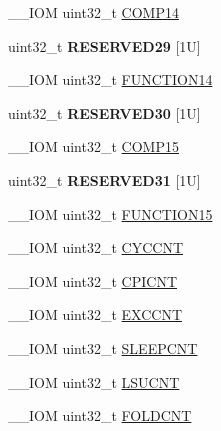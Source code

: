 \begin{DoxyCompactItemize}
\item 
\+\_\+\+\_\+\+I\+OM uint32\+\_\+t \hyperlink{struct_d_w_t___type_a85368a4ec78f4074e5f9cbba92ae1eb9}{C\+O\+M\+P14}
\item 
\mbox{\label{struct_d_w_t___type_af577b10077e677307bb79df1597141ca}} 
uint32\+\_\+t {\bfseries R\+E\+S\+E\+R\+V\+E\+D29} \mbox{[}1\+U\mbox{]}
\item 
\+\_\+\+\_\+\+I\+OM uint32\+\_\+t \hyperlink{struct_d_w_t___type_a85138a411459f923ea8e05312d70af71}{F\+U\+N\+C\+T\+I\+O\+N14}
\item 
\mbox{\label{struct_d_w_t___type_a212676fc2527b4b4f80155cb14171b4e}} 
uint32\+\_\+t {\bfseries R\+E\+S\+E\+R\+V\+E\+D30} \mbox{[}1\+U\mbox{]}
\item 
\+\_\+\+\_\+\+I\+OM uint32\+\_\+t \hyperlink{struct_d_w_t___type_aa46b44e5aacd3ca3937741f423ab480f}{C\+O\+M\+P15}
\item 
\mbox{\label{struct_d_w_t___type_aa46da05899a3c47a80b0ab33fc85f21a}} 
uint32\+\_\+t {\bfseries R\+E\+S\+E\+R\+V\+E\+D31} \mbox{[}1\+U\mbox{]}
\item 
\+\_\+\+\_\+\+I\+OM uint32\+\_\+t \hyperlink{struct_d_w_t___type_a6e5fda09de44dfcd3e177c16028ceb74}{F\+U\+N\+C\+T\+I\+O\+N15}
\item 
\+\_\+\+\_\+\+I\+OM uint32\+\_\+t \hyperlink{struct_d_w_t___type_a102eaa529d9098242851cb57c52b42d9}{C\+Y\+C\+C\+NT}
\item 
\+\_\+\+\_\+\+I\+OM uint32\+\_\+t \hyperlink{struct_d_w_t___type_a2c08096c82abe245c0fa97badc458154}{C\+P\+I\+C\+NT}
\item 
\+\_\+\+\_\+\+I\+OM uint32\+\_\+t \hyperlink{struct_d_w_t___type_a9fe20c16c5167ca61486caf6832686d1}{E\+X\+C\+C\+NT}
\item 
\+\_\+\+\_\+\+I\+OM uint32\+\_\+t \hyperlink{struct_d_w_t___type_a416a54e2084ce66e5ca74f152a5ecc70}{S\+L\+E\+E\+P\+C\+NT}
\item 
\+\_\+\+\_\+\+I\+OM uint32\+\_\+t \hyperlink{struct_d_w_t___type_acc05d89bdb1b4fe2fa499920ec02d0b1}{L\+S\+U\+C\+NT}
\item 
\+\_\+\+\_\+\+I\+OM uint32\+\_\+t \hyperlink{struct_d_w_t___type_a1cfc48384ebd8fd8fb7e5d955aae6c97}{F\+O\+L\+D\+C\+NT}
\item 
\mbox{\label{struct_d_w_t___type_ae115aa377666f6cab474d9a8bc0a00f2}} 

\end{DoxyCompactItemize}
